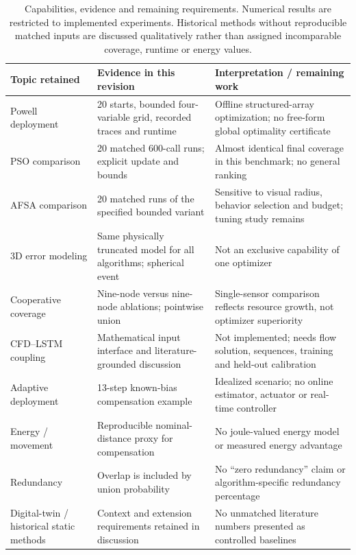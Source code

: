 \documentclass[10pt]{article}
\begin{document}
\begin{table}[htbp]\centering\small
\caption{Capabilities, evidence and remaining requirements. Numerical results are restricted to implemented experiments. Historical methods without reproducible matched inputs are discussed qualitatively rather than assigned incomparable coverage, runtime or energy values.}
\begin{tabular}{p{.21\linewidth}p{.35\linewidth}p{.35\linewidth}}\toprule
Topic retained & Evidence in this revision & Interpretation / remaining work\\\midrule
Powell deployment & 20 starts, bounded four-variable grid, recorded traces and runtime & Offline structured-array optimization; no free-form global optimality certificate\\
PSO comparison & 20 matched 600-call runs; explicit update and bounds & Almost identical final coverage in this benchmark; no general ranking\\
AFSA comparison & 20 matched runs of the specified bounded variant & Sensitive to visual radius, behavior selection and budget; tuning study remains\\
3D error modeling & Same physically truncated model for all algorithms; spherical event & Not an exclusive capability of one optimizer\\
Cooperative coverage & Nine-node versus nine-node ablations; pointwise union & Single-sensor comparison reflects resource growth, not optimizer superiority\\
CFD--LSTM coupling & Mathematical input interface and literature-grounded discussion & Not implemented; needs flow solution, sequences, training and held-out calibration\\
Adaptive deployment & 13-step known-bias compensation example & Idealized scenario; no online estimator, actuator or real-time controller\\
Energy / movement & Reproducible nominal-distance proxy for compensation & No joule-valued energy model or measured energy advantage\\
Redundancy & Overlap is included by union probability & No ``zero redundancy'' claim or algorithm-specific redundancy percentage\\
Digital-twin / historical static methods & Context and extension requirements retained in discussion & No unmatched literature numbers presented as controlled baselines\\\bottomrule
\end{tabular}
\end{table}
\end{document}
